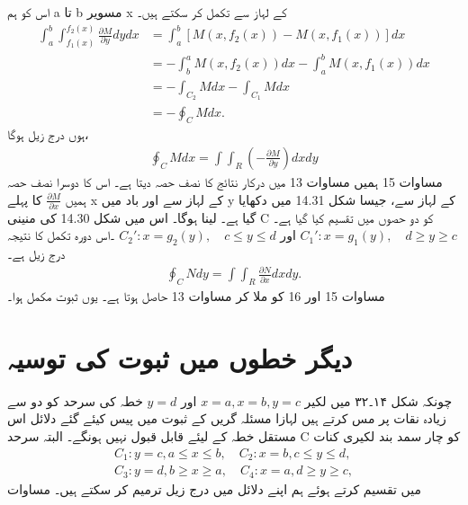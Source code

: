 \documentclass{book}
\begin{document}
\begin{urdufont}
 اس کو ہم 
a
 تا 
b
 مسویر
x
 کے لہاز سے تکمل کر سکتے ہیں۔
\begin{align*}
    \int_a^b \int_{f_1(x)}^{f_2(x)} \frac{\partial M}{\partial y} dy dx &= \int_{a}^{b} [M(x, f_2(x)) - M(x, f_1(x))] dx \\
    &= - \int_{b}^{a} M(x, f_2(x)) dx - \int_{a}^{b} M(x, f_1(x)) dx \\
    &= - \int_{C_2} M dx -\int_{C_1} M dx \\
    &= -\oint_C M dx.
\end{align*}
ہوں درج زیل ہوگا،
\begin{align*}
    \oint_C M dx = \int \int_R (-\frac{\partial M}{\partial y}) dx dy
\end{align*}
مساوات 
15
ہمیں مساوات
13
 میں درکار نتائج کا نصف حصہ دیتا ہے۔ اس کا دوسرا نصف 
حصہ ہمیں
$\frac{\partial M}{\partial x}$
کا پہلے
x
کے لہاز سے اور باد میں
y
کے لہاز سے، جیسا شکل 
14.31
میں دکھایا گیا ہے۔ لینا ہوگا۔ اس میں شکل
14.30
کی منینی
C
 کو 
دو حصوں میں تقسیم کیا گیا ہے۔ 
$C_1': x = g_1(y), \quad d \geq y \geq c$
اور
$C_2': x = g_2(y), \quad c \leq y \leq d$
۔اس دورہ تکمل کا نتیجہ درج زیل ہے۔
\begin{align}
    \oint_C N dy = \int \int_R \frac{\partial N}{\partial x} dx dy.
\end{align}
مساوات
15
اور
16
کو ملا کر مساوات 
13
 حاصل ہوتا ہے۔
یوں ثبوت مکمل ہوا۔
\section{دیگر خطوں میں ثبوت کی توسیہ}
چونکہ شکل
۱۴۔۳۲
میں لکیر
$x=a, x=b, y=c$
اور
$y=d$
خطہ کی سرحد کو دو سے زیادہ نقات پر مس کرتے ہیں لہازا مسئلہ گریں کے ثبوت میں پیس کیئے گئے دلائل اس مستقل خطہ کے لیئے قابل قبول نہیں ہونگے۔ البتہ سرحد 
C
کو چار سمد بند لکیری کنات 
\begin{align}
    C_1: y =c, a \leq x \leq b, \quad C_2: x=b, c \leq y \leq d,\\
    C_3: y=d, b \geq x \geq a, \quad C_4: x=a, d \geq y \geq c,
\end{align}
میں تقسیم کرتے ہوئے ہم اپنے دلائل میں درج زیل ترمیم کر سکتے ہیں۔ مساوات 


\end{urdufont}
\end{document}
